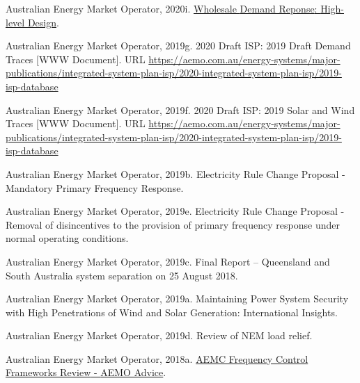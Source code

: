 \documentclass[12pt,a4paper,]{report}
\newlength{\cslhangindent}
\newenvironment{CSLReferences}[2] %
 {%
  \setlength{\parindent}{0pt}
  \ifodd #1 \everypar{\setlength{\hangindent}{\cslhangindent}}\ignorespaces\fi
  \ifnum #2 > 0
  \setlength{\parskip}{#2\baselineskip}
  \fi
 }%
 {}
\begin{document}
\begin{CSLReferences}{1}{0}
\leavevmode{}%
Australian Energy Market Operator, 2020i.
\href{https://www.aemo.com.au/-/media/files/initiatives/submissions/2020/wdrm/wdrm-high-level-design-june-2020.pdf}{Wholesale
{Demand Reponse}: {High-level Design}}.

\leavevmode{}%
Australian Energy Market Operator, 2019g. 2020 {Draft ISP}: 2019 {Draft
Demand Traces} {[}WWW Document{]}. URL
\url{https://aemo.com.au/energy-systems/major-publications/integrated-system-plan-isp/2020-integrated-system-plan-isp/2019-isp-database}

\leavevmode{}%
Australian Energy Market Operator, 2019f. 2020 {Draft ISP}: 2019 {Solar}
and {Wind Traces} {[}WWW Document{]}. URL
\url{https://aemo.com.au/energy-systems/major-publications/integrated-system-plan-isp/2020-integrated-system-plan-isp/2019-isp-database}

\leavevmode{}%
Australian Energy Market Operator, 2019b. Electricity {Rule Change
Proposal} - {Mandatory Primary Frequency Response}.

\leavevmode{}%
Australian Energy Market Operator, 2019e. Electricity {Rule Change
Proposal} - {Removal} of disincentives to the provision of primary
frequency response under normal operating conditions.

\leavevmode{}%
Australian Energy Market Operator, 2019c. Final {Report} -- {Queensland}
and {South Australia} system separation on 25 {August} 2018.

\leavevmode{}%
Australian Energy Market Operator, 2019a. Maintaining {Power System
Security} with {High Penetrations} of {Wind} and {Solar Generation}:
{International Insights}.

\leavevmode{}%
Australian Energy Market Operator, 2019d. Review of {NEM} load relief.

\leavevmode{}%
Australian Energy Market Operator, 2018a.
\href{https://www.aemc.gov.au/sites/default/files/2018-03/Advice\%20from\%20AEMO\%20-\%20Primary\%20frequency\%20control.PDF}{{AEMC
Frequency Control Frameworks Review} - {AEMO Advice}}.


\end{CSLReferences}
\end{document}
